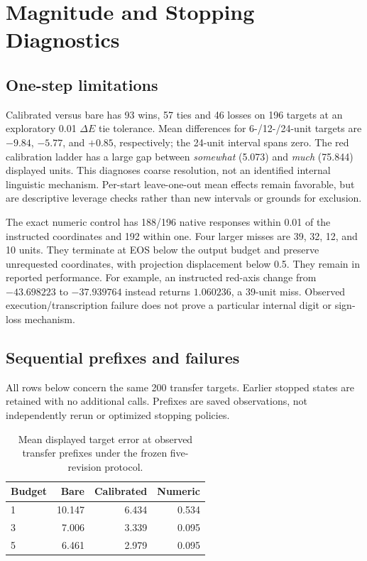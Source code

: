\section{Magnitude and Stopping Diagnostics}
\label{app:magnitude_diagnostics}

\subsection{One-step limitations}
Calibrated versus bare has 93 wins, 57 ties and 46 losses on 196 targets
at an exploratory 0.01 $\Delta E$ tie tolerance. Mean differences for
6-/12-/24-unit targets are $-9.84$, $-5.77$, and $+0.85$, respectively;
the 24-unit interval spans zero. The red calibration ladder has a large gap
between \emph{somewhat} (5.073) and \emph{much} (75.844) displayed units.
This diagnoses coarse resolution, not an identified internal linguistic
mechanism. Per-start leave-one-out mean effects remain favorable, but are
descriptive leverage checks rather than new intervals or grounds for exclusion.

The exact numeric control has 188/196 native responses within 0.01 of the
instructed coordinates and 192 within one. Four larger misses are 39, 32,
12, and 10 units. They terminate at EOS below the output budget and preserve
unrequested coordinates, with projection displacement below 0.5. They remain
in reported performance. For example, an instructed red-axis change from
$-43.698223$ to $-37.939764$ instead returns $1.060236$, a 39-unit miss.
Observed execution/transcription failure does not prove a particular internal
digit or sign-loss mechanism.

\subsection{Sequential prefixes and failures}
All rows below concern the same 200 transfer targets. Earlier stopped states
are retained with no additional calls. Prefixes are saved observations,
not independently rerun or optimized stopping policies.

\begin{table}[H]
\centering\small
\begin{tabular}{@{}lrrr@{}}
\toprule
Budget & Bare & Calibrated & Numeric \\
\midrule
1 & 10.147 & 6.434 & 0.534 \\
3 & 7.006 & 3.339 & 0.095 \\
5 & 6.461 & 2.979 & 0.095 \\
\bottomrule
\end{tabular}
\caption{Mean displayed target error at observed transfer prefixes under
the frozen five-revision protocol.}
\end{table}


